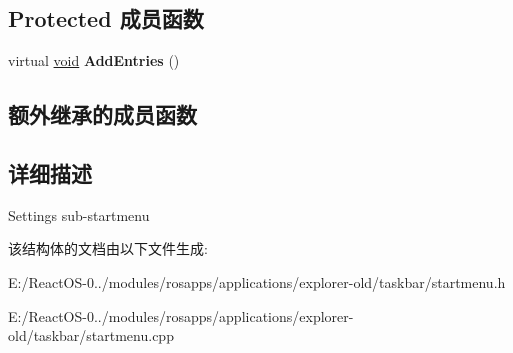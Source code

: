 \subsection*{Protected 成员函数}
\begin{DoxyCompactItemize}
\item 
\mbox{\label{struct_settings_menu_aca2a8a751f37ff55fa82692286ed1e39}} 
virtual \hyperlink{interfacevoid}{void} {\bfseries Add\+Entries} ()
\end{DoxyCompactItemize}
\subsection*{额外继承的成员函数}


\subsection{详细描述}
Settings sub-\/startmenu 

该结构体的文档由以下文件生成\+:\begin{DoxyCompactItemize}
\item 
E\+:/\+React\+O\+S-\/0../modules/rosapps/applications/explorer-\/old/taskbar/startmenu.\+h\item 
E\+:/\+React\+O\+S-\/0../modules/rosapps/applications/explorer-\/old/taskbar/startmenu.\+cpp\end{DoxyCompactItemize}
